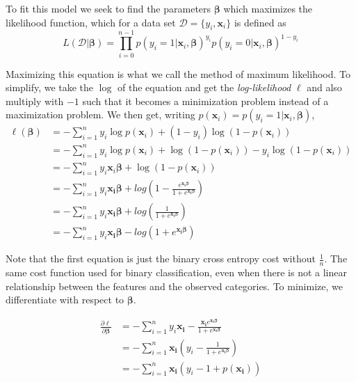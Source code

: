 \documentclass{article}
\theoremstyle{definition}
\begin{document}
To fit this model we seek to find the parameters $\boldsymbol{\beta}$ which maximizes the likelihood function, which for a data set $\mathcal{D} = \{y_i, \boldsymbol{x}_i\}$ is defined as
\begin{equation*}
    L\left( \mathcal{D} | \boldsymbol{\beta} \right) = \prod_{i = 0}^{n-1} p\left( y_i = 1 | \boldsymbol{x}_i, \boldsymbol{\beta} \right)^{y_i} p\left( y_i = 0 | \boldsymbol{x}_i, \boldsymbol{\beta} \right)^{1 - y_i}
\end{equation*}

Maximizing this equation is what we call the method of maximum likelihood. To simplify, we take the $\log$ of the equation and get the \textit{log-likelihood} $\ell$ and also multiply with $-1$ such that it becomes a minimization problem instead of a maximization problem. We then get, writing $p(\boldsymbol{x}_i) = p\left( y_i = 1 | \boldsymbol{x}_i, \boldsymbol{\beta} \right)$,
\begin{align*}
    \ell(\boldsymbol{\beta})
    &= -\sum_{i=1}^{n} y_i\log p(\boldsymbol{x}_i) + (1 - y_i)\log(1 - p(\boldsymbol{x}_i))  \label{eq:BCE_cost}\\
    &= -\sum_{i=1}^{n} y_i\log p(\boldsymbol{x}_i) + \log(1 - p(\boldsymbol{x}_i)) - y_i\log(1 - p(\boldsymbol{x}_i)) \\
    & = -\sum_{i=1}^{n} y_i\boldsymbol{x}_i\boldsymbol{\beta} + \log(1 - p(\boldsymbol{x}_i))\\
    & = - \sum_{i=1}^{n} y_i\boldsymbol{x_i} \boldsymbol{\beta} + log(1 - \frac{e^{\boldsymbol{x_i} \boldsymbol{\beta}}}{1 + e^{\boldsymbol{x_i \beta}}})\\
    & = - \sum_{i=1}^{n} y_i\boldsymbol{x_i} \boldsymbol{\beta} + log(\frac{1}{ 1 + e^{\boldsymbol{x_i \beta} }})\\
    & =  - \sum_{i=1}^{n} y_i\boldsymbol{x_i} \boldsymbol{\beta} - log(1 + e^{\boldsymbol{x_i \beta} })
\end{align*}

Note that the first equation is just the binary cross entropy cost without $\frac{1}{n}$. The same cost function used for binary classification, even when there is not a linear relationship between the features and the observed categories. To minimize, we differentiate with respect to $\boldsymbol{\beta}$. 

\begin{align*}
    \frac{\partial \ell }{\partial \boldsymbol{\beta}} &= - \sum_{i=1}^{n} y_i\boldsymbol{x_i}  - \frac{\boldsymbol{x_i} e^{\boldsymbol{x_i\beta}}}{1 + e^{\boldsymbol{x_i \beta} }}\\
    &= - \sum_{i=1}^{n}\boldsymbol{x_i} \left(y_i  - \frac{1}{1 + e^{\boldsymbol{x_i \beta} }}\right)\\
    &= - \sum_{i=1}^{n}\boldsymbol{x_i} \left(y_i  - 1 + p(\boldsymbol{x_i})\right)
\end{align*}
\end{document}
